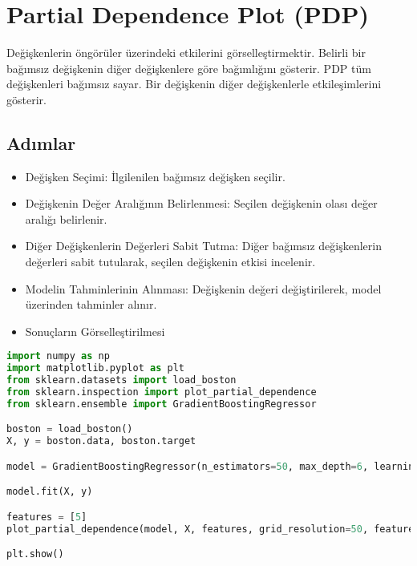 \section{Partial Dependence Plot (PDP)}
Değişkenlerin öngörüler üzerindeki etkilerini görselleştirmektir. Belirli bir bağımsız değişkenin diğer değişkenlere göre bağımlığını gösterir. PDP tüm değişkenleri bağımsız sayar. Bir değişkenin diğer değişkenlerle etkileşimlerini gösterir.

\subsection{Adımlar}
\begin{itemize}
    \item Değişken Seçimi: İlgilenilen bağımsız değişken seçilir.
    \item Değişkenin Değer Aralığının Belirlenmesi: Seçilen değişkenin olası değer aralığı belirlenir.
    \item Diğer Değişkenlerin Değerleri Sabit Tutma: Diğer bağımsız değişkenlerin değerleri sabit tutularak, seçilen değişkenin etkisi incelenir.
    \item Modelin Tahminlerinin Alınması: Değişkenin değeri değiştirilerek, model üzerinden tahminler alınır.
    \item Sonuçların Görselleştirilmesi
\end{itemize}

\begin{lstlisting}[language=Python]
import numpy as np
import matplotlib.pyplot as plt
from sklearn.datasets import load_boston
from sklearn.inspection import plot_partial_dependence
from sklearn.ensemble import GradientBoostingRegressor

boston = load_boston()
X, y = boston.data, boston.target

model = GradientBoostingRegressor(n_estimators=50, max_depth=6, learning_rate=0.1, loss='huber', random_state=4242)

model.fit(X, y)

features = [5]
plot_partial_dependence(model, X, features, grid_resolution=50, feature_names=boston.feature_names)

plt.show()
\end{lstlisting}

\newpage